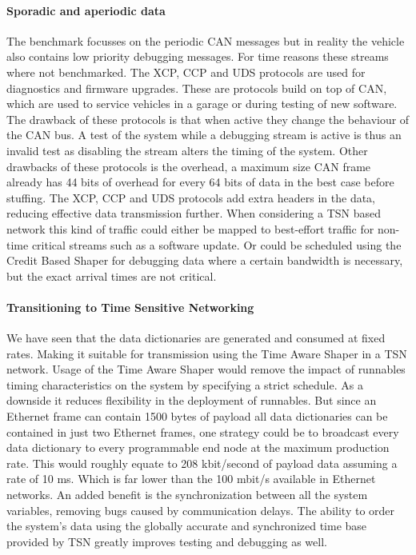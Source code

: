\paragraph{Sporadic and aperiodic data}
The benchmark focusses on the periodic CAN messages but in reality the vehicle also contains low priority debugging messages. For time reasons these streams where not benchmarked. The XCP, CCP and UDS protocols are used for diagnostics and firmware upgrades. These are protocols build on top of CAN, which are used to service vehicles in a garage or during testing of new software. The drawback of these protocols is that when active they change the behaviour of the CAN bus. A test of the system while a debugging stream is active is thus an invalid test as disabling the stream alters the timing of the system. Other drawbacks of these protocols is the overhead, a maximum size CAN frame already has 44 bits of overhead for every 64 bits of data in the best case before stuffing. The XCP, CCP and UDS protocols add extra headers in the data, reducing effective data transmission further. When considering a TSN based network this kind of traffic could either be mapped to best-effort traffic for non-time critical streams such as a software update. Or could be scheduled using the Credit Based Shaper for debugging data where a certain bandwidth is necessary, but the exact arrival times are not critical.

\paragraph{Transitioning to Time Sensitive Networking}
We have seen that the data dictionaries are generated and consumed at fixed rates. Making it suitable for transmission using the Time Aware Shaper in a TSN network. Usage of the Time Aware Shaper would remove the impact of runnables timing characteristics on the system by specifying a strict schedule. As a downside it reduces flexibility in the deployment of runnables. But since an Ethernet frame can contain 1500 bytes of payload all data dictionaries can be contained in just two Ethernet frames, one strategy could be to broadcast every data dictionary to every programmable end node at the maximum production rate. This would roughly equate to 208 kbit/second of payload data assuming a rate of 10 ms. Which is far lower than the 100 mbit/s available in Ethernet networks. An added benefit is the synchronization between all the system variables, removing bugs caused by communication delays. The ability to order the system's data using the globally accurate and synchronized time base provided by TSN greatly improves testing and debugging as well.

